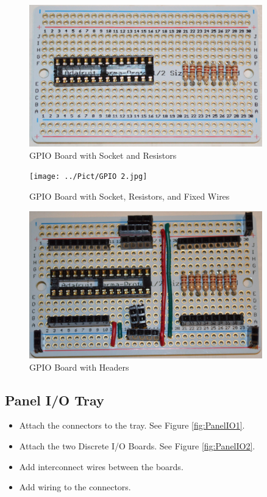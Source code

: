 \documentclass[10pt, openany]{book}
\begin{document}
\begin{figure}[ht!]
  \centering
  \includegraphics[width=0.9\textwidth]{../Pict/GPIO 1.jpg}
  \caption{GPIO Board with Socket and Resistors}
  \label{fig:GPIO1}
\end{figure}

\begin{figure}[ht!]
  \centering
  \texttt{[image: ../Pict/GPIO 2.jpg]}
  \caption{GPIO Board with Socket, Resistors, and Fixed Wires}
  \label{fig:GPIO2}
\end{figure}

\begin{figure}[ht!]
  \centering
  \includegraphics[width=0.9\textwidth]{../Pict/GPIO 3.jpg}
  \caption{GPIO Board with Headers}
  \label{fig:GPIO3}
\end{figure}

\clearpage
\subsection{Panel I/O Tray}
\begin{itemize}
  \item Attach the connectors to the tray.  See Figure \ref{fig:PanelIO1}.
  \item Attach the two Discrete I/O Boards.  See Figure \ref{fig:PanelIO2}.
  \item Add interconnect wires between the boards.
  \item Add wiring to the connectors.
\end{itemize}
\end{document}

